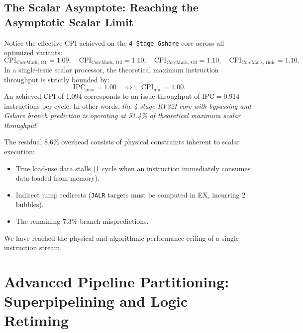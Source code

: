 \subsection{The Scalar Asymptote: Reaching the Asymptotic Scalar Limit}
Notice the effective CPI achieved on the \texttt{4-Stage Gshare} core across all optimized variants:
\begin{equation}
\text{CPI}_{\text{CoreMark, O1}} = 1.09, \quad \text{CPI}_{\text{CoreMark, O2}} = 1.10, \quad \text{CPI}_{\text{CoreMark, O3}} = 1.10, \quad \text{CPI}_{\text{CoreMark, ridic}} = 1.10.
\end{equation}
In a single-issue scalar processor, the theoretical maximum instruction throughput is strictly bounded by:
\begin{equation}
\text{IPC}_{\text{max}} = 1.00 \quad \iff \quad \text{CPI}_{\text{min}} = 1.00.
\end{equation}
An achieved CPI of $1.094$ corresponds to an issue throughput of $\text{IPC} = 0.914$ instructions per cycle. In other words, \textit{the 4-stage RV32I core with bypassing and Gshare branch prediction is operating at 91.4\% of theoretical maximum scalar throughput}!

The residual $8.6\%$ overhead consists of physical constraints inherent to scalar execution:
\begin{itemize}
    \item True load-use data stalls (1 cycle when an instruction immediately consumes data loaded from memory).
    \item Indirect jump redirects (\texttt{JALR} targets must be computed in EX, incurring 2 bubbles).
    \item The remaining $7.3\%$ branch mispredictions.
\end{itemize}
We have reached the physical and algorithmic performance ceiling of a single instruction stream.


\section{Advanced Pipeline Partitioning: Superpipelining and Logic Retiming}\label{riscvSuperpipelining}

